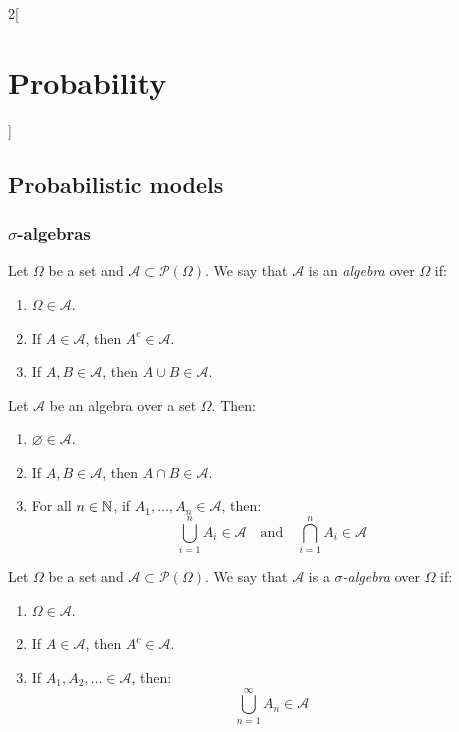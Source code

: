 \documentclass[../../../main.tex]{subfiles}
\begin{document}
\begin{multicols}{2}[\section{Probability}]
  \subsection{Probabilistic models}
  \subsubsection{\texorpdfstring{$\sigma$}{sigma}-algebras}
  \begin{definition}[Algebra]
    Let $\Omega$ be a set and $\mathcal{A}\subset\mathcal{P}(\Omega)$. We say that $\mathcal{A}$ is an \emph{algebra} over $\Omega$ if:
    \begin{enumerate}
      \item $\Omega\in\mathcal{A}$.
      \item If $A\in\mathcal{A}$, then $A^c\in\mathcal{A}$.
      \item If $A,B\in\mathcal{A}$, then $A\cup B\in\mathcal{A}$.
    \end{enumerate}
  \end{definition}
  \begin{proposition}
    Let $\mathcal{A}$ be an algebra over a set $\Omega$. Then:
    \begin{enumerate}
      \item $\varnothing\in\mathcal{A}$.
      \item If $A,B\in\mathcal{A}$, then $A\cap B\in\mathcal{A}$.
      \item For all $n\in\mathbb{N}$, if $A_1,\ldots,A_n\in\mathcal{A}$, then: $$\bigcup_{i=1}^nA_i\in\mathcal{A}\quad\text{and}\quad\bigcap_{i=1}^nA_i\in\mathcal{A}$$
    \end{enumerate}
  \end{proposition}
  \begin{definition}
    Let $\Omega$ be a set and $\mathcal{A}\subset\mathcal{P}(\Omega)$. We say that $\mathcal{A}$ is a \emph{$\sigma$-algebra} over $\Omega$ if:
    \begin{enumerate}
      \item $\Omega\in\mathcal{A}$.
      \item If $A\in\mathcal{A}$, then $A^c\in\mathcal{A}$.
      \item If $A_1,A_2,\ldots\in\mathcal{A}$, then: $$\bigcup_{n=1}^\infty A_n\in\mathcal{A}$$

\end{enumerate}
\end{definition}
\end{multicols}
\end{document}
